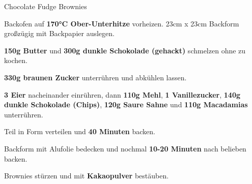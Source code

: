 \begin{recipe}[]{Chocolate Fudge Brownies} %


\step
Backofen auf \textbf{170°C Ober-Unterhitze} vorheizen. 23cm x 23cm Backform großzügig mit Backpapier auslegen.

\step
\textbf{150g Butter} und \textbf{300g dunkle Schokolade (gehackt)} schmelzen ohne zu kochen.

\step
\textbf{330g braunen Zucker} unterrühren und abkühlen lassen.

\step
\textbf{3 Eier} nacheinander einrühren, dann \textbf{110g Mehl}, \textbf{1 Vanillezucker}, \textbf{140g dunkle Schokolade (Chips)}, \textbf{120g Saure Sahne} und \textbf{110g Macadamias} unterrühren.

\step
Teil in Form verteilen und \textbf{40 Minuten} backen.

\step
Backform mit Alufolie bedecken und nochmal \textbf{10-20 Minuten} nach belieben backen.

\step
Brownies stürzen und mit \textbf{Kakaopulver} bestäuben.

\end{recipe}